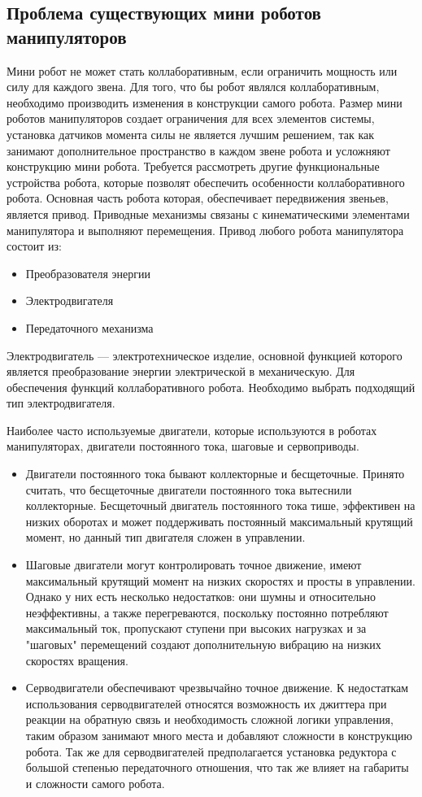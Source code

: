 \subsection{Проблема существующих мини роботов манипуляторов}
Мини робот не может стать коллаборативным, если ограничить мощность или силу для каждого звена. Для того, что бы робот являлся коллаборативным, необходимо производить изменения в конструкции самого робота.
Размер мини роботов манипуляторов создает ограничения для всех элементов системы, установка датчиков момента силы не является лучшим решением, так как занимают дополнительное пространство в каждом звене робота и усложняют конструкцию мини робота. Требуется рассмотреть другие функциональные устройства робота, которые позволят обеспечить особенности коллаборативного робота. Основная часть робота которая, обеспечивает передвижения звеньев, является привод. Приводные механизмы связаны с кинематическими элементами манипулятора и выполняют перемещения.
Привод любого робота манипулятора состоит из:
\begin{itemize}
	\item Преобразователя энергии
	\item Электродвигателя
	\item Передаточного механизма
\end{itemize}

Электродвигатель —  электротехническое изделие, основной функцией которого является преобразование энергии электрической в механическую. Для обеспечения функций коллаборативного робота. Необходимо выбрать подходящий тип электродвигателя.

Наиболее часто используемые двигатели, которые используются в роботах манипуляторах, двигатели постоянного тока, шаговые и сервоприводы.
\begin{itemize}
	\item Двигатели постоянного тока бывают коллекторные и бесщеточные. Принято считать, что бесщеточные двигатели постоянного тока вытеснили коллекторные. Бесщеточный двигатель постоянного тока тише, эффективен на низких оборотах и может поддерживать постоянный максимальный крутящий момент, но данный тип двигателя сложен в управлении\citep{medicaldesignbriefsBrushedVersus}.
	\item Шаговые двигатели могут контролировать точное движение, имеют максимальный крутящий момент на низких скоростях и просты в управлении. Однако у них есть несколько недостатков: они шумны и относительно неэффективны, а также перегреваются, поскольку постоянно потребляют максимальный ток, пропускают ступени при высоких нагрузках и за "шаговых" перемещений создают дополнительную вибрацию на низких скоростях вращения\citep{Steppermotorvibrations}.
	\item Серводвигатели обеспечивают чрезвычайно точное движение. К недостаткам использования серводвигателей относятся возможность их джиттера при реакции на обратную связь и необходимость сложной логики управления, таким образом занимают много места и добавляют сложности в конструкцию робота. Так же для серводвигателей предполагается установка редуктора с большой степенью передаточного отношения, что так же влияет на габариты и сложности самого робота.
\end{itemize}


